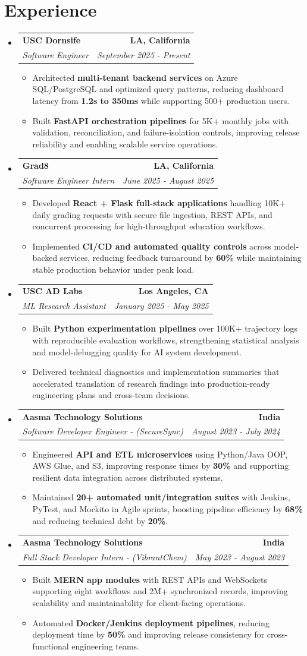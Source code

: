 \documentclass[letterpaper,10pt]{article}
\makeatletter
\newcommand{\resumeItem}[1]{\item\small{{#1 \vspace{-2pt}}}}
\newcommand{\resumeSubheading}[4]{\vspace{-2pt}\item\begin{tabular*}{1.0\textwidth}[t]{l@{\extracolsep{\fill}}r}\textbf{#1} & \textbf{\small #2} \\\textit{\small#3} & \textit{\small #4} \\\end{tabular*}\vspace{-3pt}}
\newcommand{\resumeSubHeadingListStart}{\begin{itemize}[leftmargin=0.0in, label={}]}
\newcommand{\resumeSubHeadingListEnd}{\end{itemize}}
\newcommand{\resumeItemListStart}{\begin{itemize}[leftmargin=0.15in,label=\textbullet,itemsep=0pt,topsep=0pt,parsep=0pt,partopsep=0pt]}
\newcommand{\resumeItemListEnd}{\end{itemize}\vspace{-2pt}}
\makeatother
\begin{document}
\section{Experience}
\resumeSubHeadingListStart
\resumeSubheading{USC Dornsife}{LA, California}{Software Engineer}{September 2025 - Present}
\resumeItemListStart
\resumeItem{Architected \textbf{multi-tenant backend services} on Azure SQL/PostgreSQL and optimized query patterns, reducing dashboard latency from \textbf{1.2s to 350ms} while supporting 500+ production users.}
\resumeItem{Built \textbf{FastAPI orchestration pipelines} for 5K+ monthly jobs with validation, reconciliation, and failure-isolation controls, improving release reliability and enabling scalable service operations.}
\resumeItemListEnd
\resumeSubheading{Grad8}{LA, California}{Software Engineer Intern}{June 2025 - August 2025}
\resumeItemListStart
\resumeItem{Developed \textbf{React + Flask full-stack applications} handling 10K+ daily grading requests with secure file ingestion, REST APIs, and concurrent processing for high-throughput education workflows.}
\resumeItem{Implemented \textbf{CI/CD and automated quality controls} across model-backed services, reducing feedback turnaround by \textbf{60\%} while maintaining stable production behavior under peak load.}
\resumeItemListEnd
\resumeSubheading{USC AD Labs}{Los Angeles, CA}{ML Research Assistant}{January 2025 - May 2025}
\resumeItemListStart
\resumeItem{Built \textbf{Python experimentation pipelines} over 100K+ trajectory logs with reproducible evaluation workflows, strengthening statistical analysis and model-debugging quality for AI system development.}
\resumeItem{Delivered technical diagnostics and implementation summaries that accelerated translation of research findings into production-ready engineering plans and cross-team decisions.}
\resumeItemListEnd
\resumeSubheading{Aasma Technology Solutions}{India}{Software Developer Engineer - (SecureSync)}{August 2023 - July 2024}
\resumeItemListStart
\resumeItem{Engineered \textbf{API and ETL microservices} using Python/Java OOP, AWS Glue, and S3, improving response times by \textbf{30\%} and supporting resilient data integration across distributed systems.}
\resumeItem{Maintained \textbf{20+ automated unit/integration suites} with Jenkins, PyTest, and Mockito in Agile sprints, boosting pipeline efficiency by \textbf{68\%} and reducing technical debt by \textbf{20\%}.}
\resumeItemListEnd
\resumeSubheading{Aasma Technology Solutions}{India}{Full Stack Developer Intern - (VibrantChem)}{May 2023 - August 2023}
\resumeItemListStart
\resumeItem{Built \textbf{MERN app modules} with REST APIs and WebSockets supporting eight workflows and 2M+ synchronized records, improving scalability and maintainability for client-facing operations.}
\resumeItem{Automated \textbf{Docker/Jenkins deployment pipelines}, reducing deployment time by \textbf{50\%} and improving release consistency for cross-functional engineering teams.}
\resumeItemListEnd
\resumeSubHeadingListEnd
\vspace{-15pt}
\end{document}
